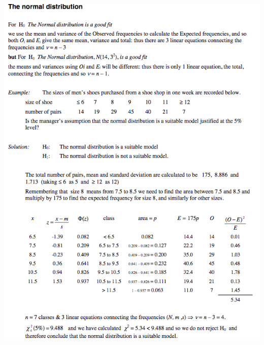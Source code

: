 \documentclass[a4paper]{article}
\begin{document}
\begin{center}
	\includegraphics[scale=0.5]{img_S/19_eg4}
\end{center}
\end{document}

